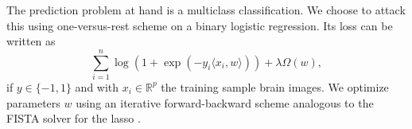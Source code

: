 \documentclass{article}
\DeclareMathOperator{\prox}{prox}
\DeclareMathOperator{\Id}{Id}
\newcommand{\R}{\mathbb{R}}
\begin{document}
The prediction problem at hand is a multiclass classification. We choose to
attack this using one-versus-rest scheme on a binary logistic regression.
Its loss can be written as
\[\sum_{i=1}^n\log(1 + \exp(-y_i\langle x_i, w\rangle)) + \lambda\Omega(w),\]
if \(y\in\{-1, 1\}\) and with \(x_i\in\R^p\) the training sample brain images.
We optimize parameters \(w\) using an iterative forward-backward
scheme analogous to the FISTA solver for the lasso \cite{beck2009}.

\end{document}
